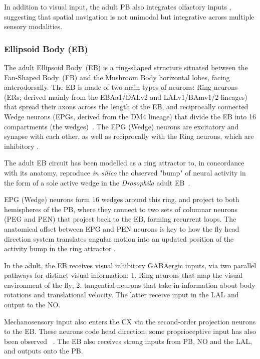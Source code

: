         In addition to visual input, the adult PB also integrates olfactory inputs \citep{hulse2021connectome}, suggesting that spatial navigation is not unimodal but integrative across multiple sensory modalities.

        \subsubsection{Ellipsoid Body (EB)}
        The adult Ellipsoid Body~(EB) is a ring-shaped structure situated between the Fan-Shaped Body~(FB) and the Mushroom Body horizontal lobes, facing anterodorsally.
        The EB is made of two main types of neurons: Ring-neurons (ERs; derived mainly from the EBAa1/DALv2 and LALv1/BAmv1/2 lineages) that spread their axons across the length of the EB, and reciprocally connected Wedge neurons (EPGs, derived from the DM4 lineage) that divide the EB into 16 compartments (the wedges)~\citep{wolff2015neuroarchitecture}.
        The EPG (Wedge) neurons are excitatory and synapse with each other, as well as reciprocally with the Ring neurons, which are inhibitory \citep{franconville2018building, hulse2021connectome}.

        The adult EB circuit has been modelled as a ring attractor \citep{Stone2017CXModel} to, in concordance with its anatomy, reproduce \textit{in silico} the observed "bump" of neural activity in the form of a sole active wedge in the \textit{Drosophila} adult EB~\citep{seelig2015neural}.

        EPG (Wedge) neurons form 16 wedges around this ring, and project to both hemispheres of the PB, where they connect to two sets of columnar neurons (PEG and PEN) that project back to the EB, forming recurrent loops.
        The anatomical offset between EPG and PEN neurons is key to how the fly head direction system translates angular motion into an updated position of the activity bump in the ring attractor \citep{Stone2017CXModel}.

        In the adult, the EB receives visual inhibitory GABAergic inputs, via two parallel pathways for distinct visual information: 1. Ring neurons that map the visual environment of the fly; 2. tangential neurons that take in information about body rotations and translational velocity. The latter receive input in the LAL and output to the NO.

        Mechanosensory input also enters the CX via the second-order projection neurons to the EB. These neurons code head direction; some proprioceptive input has also been observed ~\citep{hulse2021connectome}. The EB also receives strong inputs from PB, NO and the LAL, and outputs onto the PB.
       
